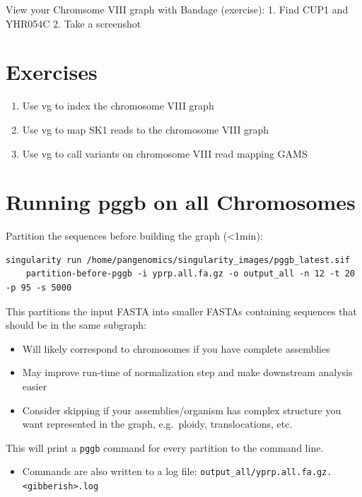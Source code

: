 \documentclass[
]{book}
\providecommand{\tightlist}{%
  \setlength{\itemsep}{0pt}\setlength{\parskip}{0pt}}
\begin{document}
View your Chromsome VIII graph with Bandage (exercise):
1. Find CUP1 and YHR054C
2. Take a screenshot

\hypertarget{exercises-1}{%
\section{Exercises}\label{exercises-1}}

\begin{enumerate}
\def\labelenumi{\arabic{enumi}.}
\tightlist
\item
  Use vg to index the chromosome VIII graph
\item
  Use vg to map SK1 reads to the chromosome VIII graph
\item
  Use vg to call variants on chromosome VIII read mapping GAMS
\end{enumerate}

\hypertarget{running-pggb-on-all-chromosomes}{%
\section{Running pggb on all Chromosomes}\label{running-pggb-on-all-chromosomes}}

Partition the sequences before building the graph (\textless1min):

\begin{verbatim}
singularity run /home/pangenomics/singularity_images/pggb_latest.sif
    partition-before-pggb -i yprp.all.fa.gz -o output_all -n 12 -t 20 -p 95 -s 5000
\end{verbatim}

This partitions the input FASTA into smaller FASTAs containing sequences that should be in the same subgraph:

\begin{itemize}
\tightlist
\item
  Will likely correspond to chromosomes if you have complete assemblies
\item
  May improve run-time of normalization step and make downstream analysis easier
\item
  Consider skipping if your assemblies/organism has complex structure you want represented in the graph, e.g.~ploidy, translocations, etc.
\end{itemize}

This will print a \texttt{pggb} command for every partition to the command line.

\begin{itemize}
\tightlist
\item
  Commands are also written to a log file: \texttt{output\_all/yprp.all.fa.gz.\textless{}gibberish\textgreater{}.log}
\end{itemize}
\end{document}

